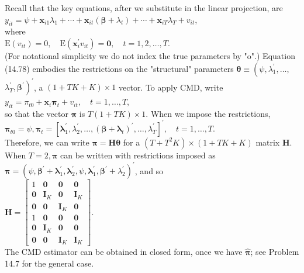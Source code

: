 \documentclass[10pt]{article}
\begin{document}
Recall that the key equations, after we substitute in the linear projection, are\\
$y_{i t}=\psi+\mathbf{x}_{i 1} \lambda_{1}+\cdots+\mathbf{x}_{i t}\left(\boldsymbol{\beta}+\lambda_{t}\right)+\cdots+\mathbf{x}_{i T} \lambda_{T}+v_{i t}$,\\
where\\
$\mathrm{E}\left(v_{i t}\right)=0, \quad \mathrm{E}\left(\mathbf{x}_{i}^{\prime} v_{i t}\right)=\mathbf{0}, \quad t=1,2, \ldots, T$.\\
(For notational simplicity we do not index the true parameters by "o".) Equation (14.78) embodies the restrictions on the "structural" parameters $\boldsymbol{\theta} \equiv\left(\psi, \lambda_{1}^{\prime}, \ldots\right.$, $\left.\lambda_{T}^{\prime}, \boldsymbol{\beta}^{\prime}\right)^{\prime}$, a $(1+T K+K) \times 1$ vector. To apply CMD, write\\
$y_{i t}=\pi_{t 0}+\mathbf{x}_{i} \boldsymbol{\pi}_{t}+v_{i t}, \quad t=1, \ldots, T$,\\
so that the vector $\boldsymbol{\pi}$ is $T(1+T K) \times 1$. When we impose the restrictions,\\
$\boldsymbol{\pi}_{t 0}=\psi, \boldsymbol{\pi}_{t}=\left[\boldsymbol{\lambda}_{1}^{\prime}, \lambda_{2}^{\prime}, \ldots,\left(\boldsymbol{\beta}+\boldsymbol{\lambda}_{t}\right)^{\prime}, \ldots, \lambda_{T}^{\prime}\right]^{\prime}, \quad t=1, \ldots, T$.\\
Therefore, we can write $\boldsymbol{\pi}=\mathbf{H} \boldsymbol{\theta}$ for a $\left(T+T^{2} K\right) \times(1+T K+K)$ matrix $\mathbf{H}$. When $T=2, \boldsymbol{\pi}$ can be written with restrictions imposed as $\boldsymbol{\pi}=\left(\psi, \boldsymbol{\beta}^{\prime}+\boldsymbol{\lambda}_{1}^{\prime}, \boldsymbol{\lambda}_{2}^{\prime}, \psi, \boldsymbol{\lambda}_{1}^{\prime}, \boldsymbol{\beta}^{\prime}+\right. \left.\lambda_{2}^{\prime}\right)^{\prime}$, and so\\
$\mathbf{H}=\left[\begin{array}{llll}1 & \mathbf{0} & \mathbf{0} & \mathbf{0} \\ \mathbf{0} & \mathbf{I}_{K} & \mathbf{0} & \mathbf{I}_{K} \\ \mathbf{0} & \mathbf{0} & \mathbf{I}_{K} & \mathbf{0} \\ 1 & \mathbf{0} & \mathbf{0} & \mathbf{0} \\ \mathbf{0} & \mathbf{I}_{K} & \mathbf{0} & \mathbf{0} \\ \mathbf{0} & \mathbf{0} & \mathbf{I}_{K} & \mathbf{I}_{K}\end{array}\right]$.\\
The CMD estimator can be obtained in closed form, once we have $\hat{\boldsymbol{\pi}}$; see Problem 14.7 for the general case.
\end{document}
